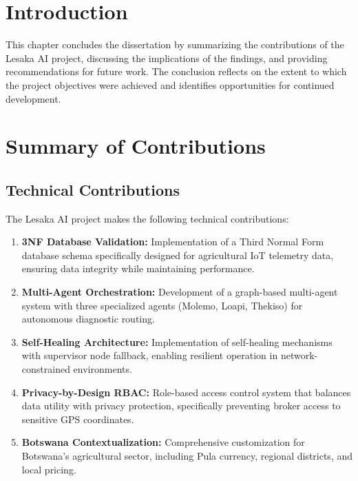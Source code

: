 
\section{Introduction}

This chapter concludes the dissertation by summarizing the contributions of the Lesaka AI project, discussing the implications of the findings, and providing recommendations for future work. The conclusion reflects on the extent to which the project objectives were achieved and identifies opportunities for continued development.

\section{Summary of Contributions}

\subsection{Technical Contributions}

The Lesaka AI project makes the following technical contributions:

\begin{enumerate}
    \item \textbf{3NF Database Validation:} Implementation of a Third Normal Form database schema specifically designed for agricultural IoT telemetry data, ensuring data integrity while maintaining performance.
    
    \item \textbf{Multi-Agent Orchestration:} Development of a graph-based multi-agent system with three specialized agents (Molemo, Loapi, Thekiso) for autonomous diagnostic routing.
    
    \item \textbf{Self-Healing Architecture:} Implementation of self-healing mechanisms with supervisor node fallback, enabling resilient operation in network-constrained environments.
    
    \item \textbf{Privacy-by-Design RBAC:} Role-based access control system that balances data utility with privacy protection, specifically preventing broker access to sensitive GPS coordinates.
    
    \item \textbf{Botswana Contextualization:} Comprehensive customization for Botswana's agricultural sector, including Pula currency, regional districts, and local pricing.
\end{enumerate}

